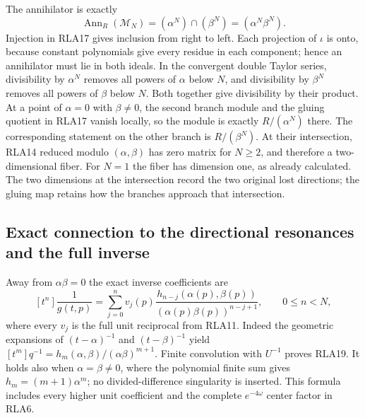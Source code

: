 The annihilator is exactly
\[
 \operatorname{Ann}_R(\mathcal M_N)
       =(\alpha^N)\cap(\beta^N)=(\alpha^N\beta^N).
 \tag{RLA18}
\]
Injection in RLA17 gives inclusion from right to left.
Each projection of $\iota$ is onto, because constant polynomials
give every residue in each component; hence an annihilator must
lie in both ideals.  In the convergent double Taylor series,
divisibility by $\alpha^N$ removes all powers of $\alpha$ below
$N$, and divisibility by $\beta^N$ removes all powers of $\beta$
below $N$.  Both together give divisibility by their product.
At a point of $\alpha=0$ with $\beta\ne0$, the second branch
module and the gluing quotient in RLA17 vanish locally, so the
module is exactly $R/(\alpha^N)$ there.  The corresponding
statement on the other branch is $R/(\beta^N)$.
At their intersection, RLA14 reduced modulo $(\alpha,\beta)$ has
zero matrix for $N\ge2$, and therefore a two-dimensional fiber.
For $N=1$ the fiber has dimension one, as already calculated.
The two dimensions at the intersection record the two original
lost directions; the gluing map retains how the branches approach
that intersection.

\subsection{Exact connection to the directional resonances and the full inverse}

Away from $\alpha\beta=0$ the exact inverse coefficients are
\[
 [t^n]\frac1{g(t,p)}
 =\sum_{j=0}^n v_j(p)
       \frac{h_{n-j}(\alpha(p),\beta(p))}
            {(\alpha(p)\beta(p))^{n-j+1}},\qquad 0\le n<N,
 \tag{RLA19}
\]
where every $v_j$ is the full unit reciprocal from RLA11.
Indeed the geometric expansions of $(t-\alpha)^{-1}$ and
$(t-\beta)^{-1}$ yield
$[t^m]q^{-1}=h_m(\alpha,\beta)/(\alpha\beta)^{m+1}$.
Finite convolution with $U^{-1}$ proves RLA19.  It holds also
when $\alpha=\beta\ne0$, where the polynomial finite sum gives
$h_m=(m+1)\alpha^m$; no divided-difference singularity is inserted.
This formula includes every higher unit coefficient and the complete
$e^{-4\omega}$ center factor in RLA6.

